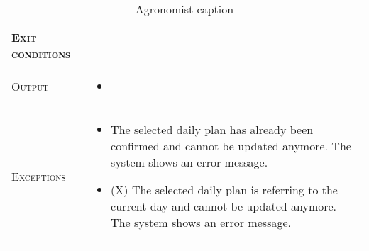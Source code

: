 \begin{table}[H]
\begin{tabular}[c]{|l|p{}|}
        \hline %
        \textsc{Exit conditions}    &  %
        \\
    	\hline %
    	\textsc{Output}             &  \begin{itemize}
    	    \item %
    	\end{itemize}\\
    	\hline %
    	\textsc{Exceptions}         &  \begin{itemize}
    	    \item The selected daily plan has already been confirmed and cannot be updated anymore. The system shows an error message.
    	    \item (X) The selected daily plan is referring to the current day and cannot be updated anymore. The system shows an error message.
    	\end{itemize}\\
    	
    	\hline %
        
    \end{tabular}
    \caption{\label{tab:daily_plan_section_access}Agronomist caption }
\end{table}




